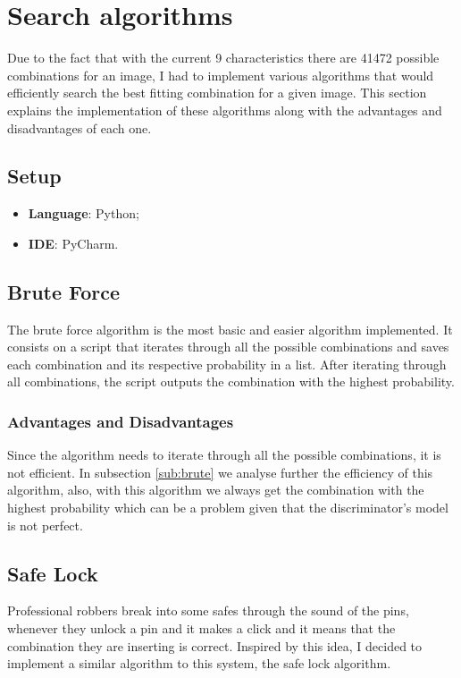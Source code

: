 \documentclass[12pt,a4paper,oneside]{memoir}
\begin{document}
\section{Search algorithms}
Due to the fact that with the current 9 characteristics there are 41472 possible combinations for an image, I had to implement various algorithms that would efficiently search the best fitting combination for a given image. This section explains the implementation of these algorithms along with the advantages and disadvantages of each one. 
\label{sec:search}


\subsection{Setup}
\label{sec:search_setup}
\begin{itemize}
    \item \textbf{Language}: Python;
    \item \textbf{\acs{IDE}}: PyCharm.
\end{itemize}

\subsection{Brute Force}
\label{sec:cganbrute}
The brute force algorithm is the most basic and easier algorithm implemented. It consists on a script that iterates through all the possible combinations and saves each combination and its respective probability in a list. After iterating through all combinations, the script outputs the combination with the highest probability.   
    \subsubsection{Advantages and Disadvantages}
    Since the algorithm needs to iterate through all the possible combinations, it is not efficient. In subsection \ref{sub:brute} we analyse further the efficiency of this algorithm, also, with this algorithm we always get the combination with the highest probability which can be a problem given that the discriminator's model is not perfect.
    \label{sec:bruteadv}

\subsection{Safe Lock}
\label{sec:lock}
Professional robbers break into some safes through the sound of the pins, whenever they unlock a pin and it makes a click and it means that the combination they are inserting is correct. Inspired by this idea, I decided to implement a similar algorithm to this system, the safe lock algorithm.
\end{document}
